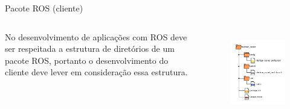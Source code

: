 \documentclass[10pt]{beamer}
\begin{document}

\begin{frame}{Pacote ROS (cliente)}
    \begin{alertblock}{}
		\begin{columns}
				No desenvolvimento de aplicações com ROS deve ser respeitada a estrutura de
				diretórios de um pacote ROS, portanto o desenvolvimento do cliente deve lever em consideração essa estrutura.
			\begin{figure}[h]
				\begin{center}
					\includegraphics[scale=0.4]{imagens/rospackage.png}\\
				\end{center}
				\label{fig:pkg}
			\end{figure}
		\end{columns}
	\end{alertblock}
\end{frame}
\end{document}
